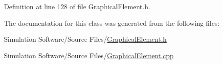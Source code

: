 Definition at line 128 of file Graphical\+Element.\+h.



The documentation for this class was generated from the following files\+:\begin{DoxyCompactItemize}
\item 
Simulation Software/\+Source Files/\hyperlink{_graphical_element_8h}{Graphical\+Element.\+h}\item 
Simulation Software/\+Source Files/\hyperlink{_graphical_element_8cpp}{Graphical\+Element.\+cpp}\end{DoxyCompactItemize}
